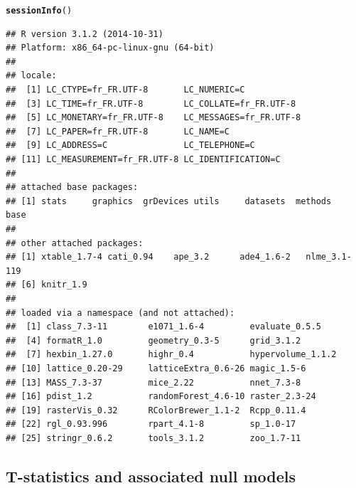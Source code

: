 \documentclass[12pt]{article}\usepackage[]{graphicx}\usepackage[]{color}
\makeatletter
\newcommand{\hlstd}[1]{\textcolor[rgb]{0.345,0.345,0.345}{#1}}%
\newcommand{\hlkwd}[1]{\textcolor[rgb]{0.737,0.353,0.396}{\textbf{#1}}}%
\newenvironment{kframe}{%
 \def\at@end@of@kframe{}%
 \ifinner\ifhmode%
  \def\at@end@of@kframe{\end{minipage}}%
  \begin{minipage}{\columnwidth}%
 \fi\fi%
 \def\FrameCommand##1{\hskip\@totalleftmargin \hskip-\fboxsep
 \colorbox{shadecolor}{##1}\hskip-\fboxsep
     \hskip-\linewidth \hskip-\@totalleftmargin \hskip\columnwidth}%
 \MakeFramed {\advance\hsize-\width
   \@totalleftmargin\z@ \linewidth\hsize
   \@setminipage}}%
 {\par\unskip\endMakeFramed%
 \at@end@of@kframe}
\newenvironment{knitrout}{}{} %
\makeatother
\begin{document}
\begin{knitrout}\small
{}\color{fgcolor}\begin{kframe}
\begin{alltt}
\hlkwd{sessionInfo}\hlstd{()}
\end{alltt}
\begin{verbatim}
## R version 3.1.2 (2014-10-31)
## Platform: x86_64-pc-linux-gnu (64-bit)
## 
## locale:
##  [1] LC_CTYPE=fr_FR.UTF-8       LC_NUMERIC=C              
##  [3] LC_TIME=fr_FR.UTF-8        LC_COLLATE=fr_FR.UTF-8    
##  [5] LC_MONETARY=fr_FR.UTF-8    LC_MESSAGES=fr_FR.UTF-8   
##  [7] LC_PAPER=fr_FR.UTF-8       LC_NAME=C                 
##  [9] LC_ADDRESS=C               LC_TELEPHONE=C            
## [11] LC_MEASUREMENT=fr_FR.UTF-8 LC_IDENTIFICATION=C       
## 
## attached base packages:
## [1] stats     graphics  grDevices utils     datasets  methods   base     
## 
## other attached packages:
## [1] xtable_1.7-4 cati_0.94    ape_3.2      ade4_1.6-2   nlme_3.1-119
## [6] knitr_1.9   
## 
## loaded via a namespace (and not attached):
##  [1] class_7.3-11        e1071_1.6-4         evaluate_0.5.5     
##  [4] formatR_1.0         geometry_0.3-5      grid_3.1.2         
##  [7] hexbin_1.27.0       highr_0.4           hypervolume_1.1.2  
## [10] lattice_0.20-29     latticeExtra_0.6-26 magic_1.5-6        
## [13] MASS_7.3-37         mice_2.22           nnet_7.3-8         
## [16] pdist_1.2           randomForest_4.6-10 raster_2.3-24      
## [19] rasterVis_0.32      RColorBrewer_1.1-2  Rcpp_0.11.4        
## [22] rgl_0.93.996        rpart_4.1-8         sp_1.0-17          
## [25] stringr_0.6.2       tools_3.1.2         zoo_1.7-11
\end{verbatim}
\end{kframe}
\end{knitrout}

  \subsection {T-statistics and associated null models}
  
\end{document}

